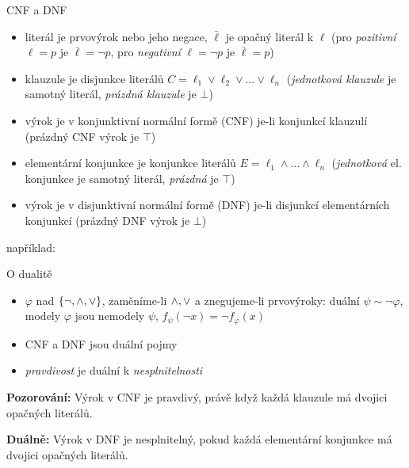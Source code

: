 \documentclass{beamer}
\begin{document}
\begin{frame}{CNF a DNF}

    \begin{itemize}
        \item \alert{literál} je prvovýrok nebo jeho negace, 
        $\bar \ell$ je \alert{opačný literál} k $\ell$ (pro \emph{pozitivní} $\ell=p$ je $\bar \ell=\neg p$, pro \emph{negativní}  $\ell=\neg p$  je $\bar \ell=p$)
        \item \alert{klauzule} je disjunkce literálů $C=\ell_1\lor\ell_2\lor\dots\lor\ell_n$ 
        (\emph{jednotková klauzule} je samotný literál, \emph{prázdná klauzule} je $\bot$)
        \item výrok je v \alert{konjunktivní normální formě} (\alert{CNF}) je-li konjunkcí klauzulí (prázdný CNF výrok je $\top$)
        \item \alert{elementární konjunkce} je konjunkce literálů $E=\ell_1\land\dots\land\ell_n$ (\emph{jednotková} el. konjunkce je samotný literál,  \emph{prázdná} je $\top$)
        \item výrok je v \alert{disjunktivní normální formě} (\alert{DNF}) je-li disjunkcí elementárních konjunkcí (prázdný DNF výrok je $\bot$)
    \end{itemize}

    například:

\end{frame}


\begin{frame}{O dualitě}

    \vspace{-12pt}

    \begin{itemize}
        \item $\varphi$ nad $\{\neg,{\land},{\lor}\}$, zaměníme-li ${\land},{\lor}$ a znegujeme-li prvovýroky: \alert{duální} $\psi\sim\neg\varphi$, modely $\varphi$ jsou nemodely $\psi$, $f_\psi(\neg x)=\neg f_\varphi(x)$
        \item CNF a DNF jsou duální pojmy
        \item \emph{pravdivost} je duální k \emph{nesplnitelnosti} 
    \end{itemize}

    \textbf{Pozorování:} Výrok v CNF je \alert{pravdivý}, právě když každá klauzule má dvojici opačných literálů.

    \textbf{Duálně:} Výrok v DNF je \alert{nesplnitelný}, pokud každá elementární konjunkce má dvojici opačných literálů.
       
\end{frame}
\end{document}
